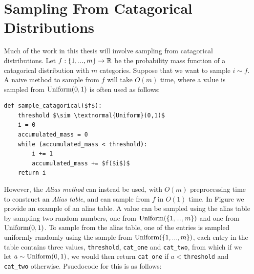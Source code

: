 











\section{Sampling From Catagorical Distributions}
\label{sec:2-6-sampling}






    Much of the work in this thesis will involve sampling from catagorical distributions. Let $f:\{1,...,m\}\rightarrow\mathbb{R}$ be the probability mass function of a catagorical distribution with $m$ categories. Suppose that we want to sample $i\sim f$. A naive method to sample from $f$ will take $O(m)$ time, where a value is sampled from $\textnormal{Uniform}(0,1)$ is often used as follows:

    \begin{lstlisting}
def sample_catagorical($f$):
    threshold $\sim \textnormal{Uniform}(0,1)$
    i = 0
    accumulated_mass = 0
    while (accumulated_mass < threshold):
        i += 1
        accumulated_mass += $f($i$)$
    return i
    \end{lstlisting}

    However, the \textit{Alias method}  can instead be used, with $O(m)$ preprocessing time to construct an \textit{Alias table}, and can sample from $f$ in $O(1)$ time. In Figure  we provide an example of an alias table. A value can be sampled using the alias table by sampling two random numbers, one from $\textnormal{Uniform}(\{1,...,m\})$ and one from $\textnormal{Uniform}(0,1)$. To sample from the alias table, one of the entries is sampled uniformly randomly using the sample from $\textnormal{Uniform}(\{1,...,m\})$, each entry in the table contains three values, \texttt{threshold}, \texttt{cat\_one} and \texttt{cat\_two}, from which if we let $a\sim\textnormal{Uniform}(0,1)$, we would then return \texttt{cat\_one} if $a<$\texttt{threshold} and \texttt{cat\_two} otherwise. Psuedocode for this is as follows:

